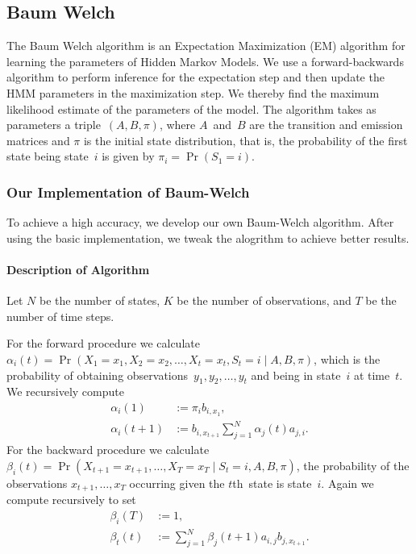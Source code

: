 \documentclass[twoside]{article}
\begin{document}
\subsection{Baum Welch}\label{sec:baum-welch}
The Baum Welch algorithm is an Expectation Maximization (EM) algorithm for learning the parameters of Hidden Markov Models.
We use a forward-backwards algorithm to perform inference for the expectation step and then update the HMM parameters in the maximization step.
We thereby find the maximum likelihood estimate of the parameters of the model.
The algorithm takes as parameters a triple~$(A, B, \pi)$, where $A$~and~$B$ are the transition and emission matrices and $\pi$ is the initial state distribution, that is, the probability of the first state being state~$i$ is given by ${\pi_i = \Pr(S_1 = i)}$.

\subsubsection{Our Implementation of Baum-Welch}\label{sec:expl-algor}

To achieve a high accuracy, we develop our own Baum-Welch algorithm.
After using the basic implementation, we tweak the alogrithm to achieve better results.

\paragraph{Description of Algorithm}

Let $N$ be the number of states, $K$ be the number of observations, and $T$ be the number of time steps.

For the forward procedure we calculate ${\alpha_i(t) = \Pr(X_1 = x_1, X_2 = x_2, \ldots, X_t = x_t, S_t = i \mid A, B, \pi)}$, which is the probability of obtaining observations~${y_1, y_2, \ldots, y_t}$ and being in state~$i$ at time~$t$.
We recursively compute
\begin{align*}
  \alpha_i (1) &:= \pi_i b_{i, x_1},\\
  \alpha_i (t + 1) &:= b_{i, x_{t+1}} \sum_{j=1}^N \alpha_j(t) a_{j, i}.
\end{align*}
For the backward procedure we calculate ${\beta_i(t) = \Pr(X_{t+1} = x_{t+1}, \ldots, X_T = x_T \mid S_t = i, A, B, \pi)}$, the probability of the observations ${x_{t+1}, \ldots, x_T}$ occurring given the $t$th~state is state~$i$.
Again we compute recursively to set
\begin{align*}
  \beta_i(T) &:= 1,\\
  \beta_t(t) &:= \sum_{j=1}^N \beta_j(t+1) a_{i, j} b_{j, x_{t+1}}.
\end{align*}
\end{document}
